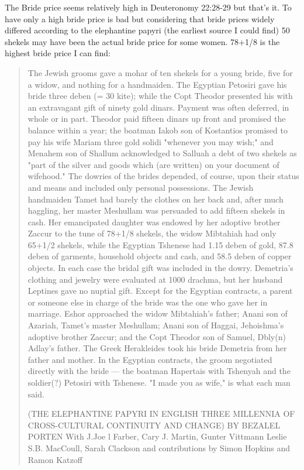 \documentclass[11pt]{article}
\begin{document}
The Bride price seems relatively high in Deuteronomy 22:28-29 but that's it. To have only a high bride price is bad but considering that bride prices widely differed according to the elephantine papyri (the earliest source I could find) 50 shekels may have been the actual bride price for some women. 78+1/8 is the highest bride price I can find:

\begin{quote} 
The Jewish grooms gave a mohar of ten shekels for a young bride, five for a widow, and nothing for a handmaiden. The Egyptian Petosiri gave his bride three deben (= 30 kite); while the Copt Theodor presented his with an extravagant gift of ninety gold dinars. Payment was often deferred, in whole or in part. Theodor paid fifteen dinars up front and promised the balance within a year; the boatman Iakob son of Kostantios promised to pay his wife Mariam three gold solidi "whenever you may wish;" and Menahem son of Shallum acknowledged to Salluah a debt of two shekels as "part of the silver and goods which (are written) on your document of wifehood."  The dowries of the brides depended, of course, upon their status and means and included only personal possessions. The Jewish handmaiden Tamet had barely the clothes on her back and, after much haggling, her master Meshullam was persuaded to add fifteen shekels in cash. Her emancipated daughter was endowed by her adoptive brother Zaccur to the tune of 78+1/8 shekels, the widow Mibtahiah had only 65+1/2 shekels, while the Egyptian Tshenese had 1.15 deben of gold, 87.8 deben of garments, household objects and cash, and 58.5 deben of copper objects. In each case the bridal gift was included in the dowry. Demetria's clothing and jewelry were evaluated at 1000 drachma, but her husband Leptines gave no nuptial gift. Except for the Egyptian contracts, a parent or someone else in charge of the bride was the one who gave her in marriage. Eshor approached the widow Mibtahiah's father; Anani son of Azariah, Tamet's master Meshullam; Anani son of Haggai, Jehoishma's adoptive brother Zaccur; and the Copt Theodor son of Samuel, Dbly(n) Adlay's father. The Greek Herakleides took his bride Demetria from her father and mother. In the Egyptian contracts, the groom negotiated directly with the bride — the boatman Hapertais with Tshenyah and the soldier(?) Petosiri with Tshenese. "I made you as wife," is what each man said.  

(THE ELEPHANTINE PAPYRI IN ENGLISH
THREE MILLENNIA OF CROSS-CULTURAL
CONTINUITY AND CHANGE)
BY
BEZALEL PORTEN
With
J.Joe l Farber, Cary J. Martin, Gunter Vittmann
Leslie S.B. MacCoull, Sarah Clackson
and contributions by
Simon Hopkins and Ramon Katzoff
\end{quote}
\end{document}

